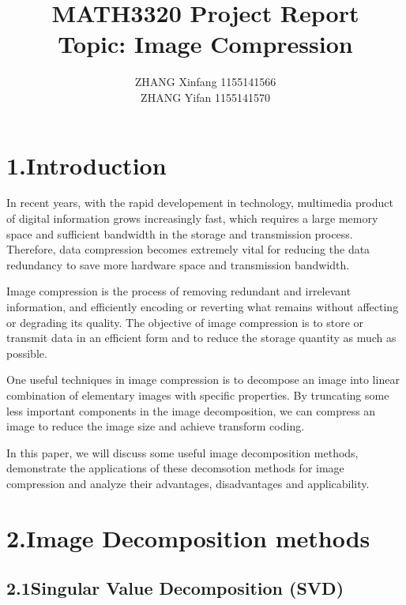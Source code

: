 \documentclass[12pt]{article}
\title{MATH3320 Project Report\\Topic: Image Compression}
\author{ZHANG Xinfang 1155141566\\ZHANG Yifan 1155141570}
\date{\displaydate{date}}
\begin{document}
\maketitle
\newpage


\section*{1.\quad Introduction}
\begin{flushleft}
In recent years, with the rapid developement in technology, multimedia product 
of digital information grows increasingly fast, which requires a large memory space 
and sufficient bandwidth in the storage and transmission process. 
Therefore, data compression becomes extremely vital for reducing the data 
redundancy to save more hardware space and transmission bandwidth. 

Image compression is the process of removing redundant and irrelevant information, 
and efficiently encoding or reverting what remains without affecting or degrading its quality. 
The objective of image compression is to store or transmit data in an efficient form
and to reduce the storage quantity as much as possible.

One useful techniques in image compression is to decompose an image into linear combination 
of elementary images with specific properties. By truncating some less important components 
in the image decomposition, we can compress an image to reduce the image size 
and achieve transform coding. 

In this paper, we will discuss some useful image decomposition methods, demonstrate the 
applications of these decomsotion methods for image compression and analyze their advantages,
disadvantages and applicability.
\end{flushleft}


\section*{2.\quad Image Decomposition methods}
\subsection*{2.1\quad Singular Value Decomposition (SVD)}
\end{document}
